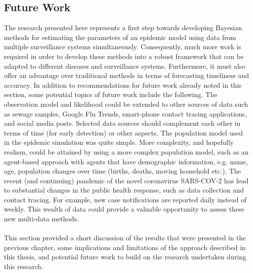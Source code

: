 \subsection{Future Work}
The research presented here represents a first step towards developing Bayesian methods for estimating the parameters of an epidemic model using data from multiple surveillance systems simultaneously. Consequently, much more work is required in order to develop these methods into a robust framework that can be adapted to different diseases and surveillance systems. Furthermore, it must also offer an advantage over traditional methods in terms of forecasting timeliness and accuracy. In addition to recommendations for future work already noted in this section, some potential topics of future work include the following.
The observation model and likelihood could be extended to other sources of data such as sewage samples, Google Flu Trends, smart-phone contact tracing applications, and social media posts. Selected data sources should complement each other in terms of time (for early detection) or other aspects. 
The population model used in the epidemic simulation was quite simple. More complexity, and hopefully realism, could be attained by using a more complex population model, such as an agent-based approach with agents that have demographic information, e.g. name, age, population changes over time (births, deaths, moving household etc.). 
The recent (and continuing) pandemic of the novel coronavirus SARS-COV-2 has lead to substantial changes in the public health response, such as data collection and contact tracing. For example, new case notifications are reported daily instead of weekly. This wealth of data could provide a valuable opportunity to assess these new multi-data methods.
\\ \\
This section provided a short discussion of the results that were presented in the previous chapter, some implications and limitations of the approach described in this thesis, and potential future work to build on the research undertaken during this research.
